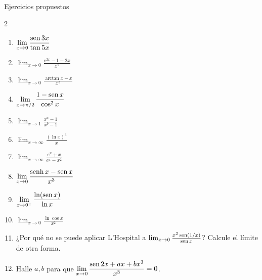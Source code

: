 \documentclass[10pt,aspectratio=169]{beamer}
\begin{document}
\begin{frame}{Ejercicios propuestos}
  \small
  \begin{ejercicio}
    \begin{multicols}{2}
    \begin{enumerate}
      \item $\displaystyle\lim_{x\to0}\frac{\operatorname{sen}3x}{\tan5x}$
      \item $\displaystyle\lim_{x\to0}\frac{e^{2x}-1-2x}{x^2}$
      \item $\displaystyle\lim_{x\to0}\frac{\arctan x-x}{x^3}$
      \item $\displaystyle\lim_{x\to\pi/2}\frac{1-\operatorname{sen} x}{\cos^2x}$
      \item $\displaystyle\lim_{x\to1}\frac{x^a-1}{x^b-1}$
      \item $\displaystyle\lim_{x\to\infty}\frac{(\ln x)^3}{x}$
      \item $\displaystyle\lim_{x\to\infty}\frac{e^x+x}{e^x-x^2}$
      \item $\displaystyle\lim_{x\to0}\frac{\operatorname{senh} x-\operatorname{sen} x}{x^3}$
      \item $\displaystyle\lim_{x\to0^+}\frac{\ln(\operatorname{sen} x)}{\ln x}$
      \item $\displaystyle\lim_{x\to0}\frac{\ln\cos x}{x^2}$
    \end{enumerate}
    \end{multicols}
  \end{ejercicio}
  \begin{ejercicio}[: análisis]
    \begin{enumerate}
      \setcounter{enumi}{10}
      \item ¿Por qué no se puede aplicar L'Hospital a $\lim_{x\to0}\frac{x^2\operatorname{sen}(1/x)}{\operatorname{sen} x}$? Calcule el límite de otra forma.
      \item Halle $a,b$ para que $\displaystyle\lim_{x\to0}\frac{\operatorname{sen}2x+ax+bx^3}{x^3}=0$.
    \end{enumerate}
  \end{ejercicio}
\end{frame}
\end{document}
